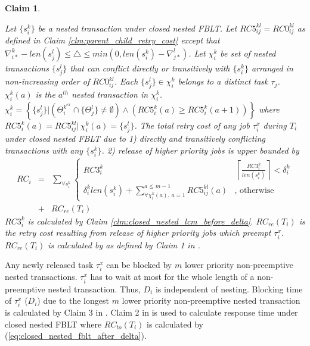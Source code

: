 \documentclass[letter]{sig-alternate}
\newtheorem{clm}{Claim}
\begin{document}
\begin{clm}\label{clm:closed_nested_fblt_final}

Let $\{s_{i}^{k}\}$ be a nested transaction under closed nested FBLT.
Let $RC5_{ij}^{kl}=RC0_{ij}^{kl}$ as defined in Claim \ref{clm:parent_child_retry_cost}
except that $\nabla_{i*}^{k}-len\left(s_{j}^{l}\right)\le\triangle\le min\left(0,len\left(s_{i}^{k}\right)-\nabla_{j*}^{l}\right)$.
Let $\chi_{i}^{k}$ be set of nested transactions $\{s_{j}^{l}\}$
that can conflict directly or transitively with $\{s_{i}^{k}\}$ arranged
in non-increasing order of $RC0_{ij}^{kl}$. Each $\{s_{j}^{l}\}\in\chi_{i}^{k}$
belongs to a distinct task $\tau_{j}$. $\chi_{i}^{k}(a)$ is the
$a^{th}$ nested transaction in $\chi_{i}^{k}$. $\chi_{i}^{k}=\left\{ \{s_{j}^{l}\}|\left(\Theta_{i}^{k^{ex}}\cap\{\Theta_{j}^{l}\}\neq\emptyset\right)\wedge\left(RC5_{i}^{k}(a)\ge RC5_{i}^{k}(a+1)\right)\right\} $
where $RC5_{i}^{k}(a)=RC5_{ij}^{kl}|\,\chi_{i}^{k}(a)=\{s_{j}^{l}\}$.
The total retry cost of any job $\tau_{i}^{x}$ during $T_{i}$ under
closed nested FBLT due to 1) directly and transitively conflicting
transactions with any $\{s_{i}^{k}\}$. 2) release of higher priority
jobs is upper bounded by 
\begin{eqnarray}
RC_{i} & = & \sum_{\forall s_{i}^{k}}\begin{cases}
RC3_{i}^{k} & \,\left\lceil \frac{RC3_{i}^{k}}{len\left(s_{i}^{k}\right)}\right\rceil <\delta_{i}^{k}\\
\delta_{i}^{k}len\left(s_{i}^{k}\right)+\sum_{\forall\chi_{i}^{k}(a),\, a=1}^{a\le m-1}RC5_{ij}^{kl}(a) & \mbox{, otherwise}
\end{cases}\nonumber \\
 & + & RC_{re}(T_{i})\label{eq:closed_nested_fblt_after_delta}
\end{eqnarray}
$RC3_{i}^{k}$ is calculated by Claim \ref{clm:closed_nested_lcm_before_delta}.
$RC_{re}(T_{i})$ is the retry cost resulting from release of higher
priority jobs which preempt $\tau_{i}^{x}$. $RC_{re}(T_{i})$ is
calculated by as defined by Claim 1 in \cite{fblt}.

\end{clm}

Any newly released task $\tau_{i}^{x}$ can be blocked by $m$ lower
priority non-preemptive nested transactions. $\tau_{i}^{x}$ has to
wait at most for the whole length of a non-preemptive nested transaction.
Thus, $D_{i}$ is independent of nesting. Blocking time of $\tau_{i}^{x}$
($D_{i}$) due to the longest $m$ lower priority non-preemptive nested
transaction is calculated by Claim 3 in \cite{fblt}. Claim 2 in \cite{fblt}
is used to calculate response time under closed nested FBLT where
$RC_{to}(T_{i})$ is calculated by (\ref{eq:closed_nested_fblt_after_delta}).
\end{document}
